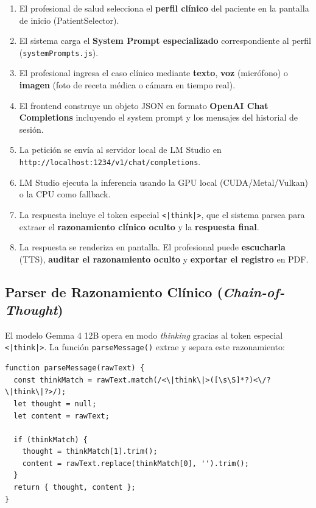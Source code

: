 \documentclass[12pt,a4paper]{article}
\begin{document}
\begin{enumerate}[label=\textbf{Paso \arabic*.}]
  \item El profesional de salud selecciona el \textbf{perfil clínico} del paciente en la pantalla
    de inicio (PatientSelector).
  \item El sistema carga el \textbf{System Prompt especializado} correspondiente al perfil
    (\texttt{systemPrompts.js}).
  \item El profesional ingresa el caso clínico mediante \textbf{texto}, \textbf{voz} (micrófono)
    o \textbf{imagen} (foto de receta médica o cámara en tiempo real).
  \item El frontend construye un objeto JSON en formato \textbf{OpenAI Chat Completions}
    incluyendo el system prompt y los mensajes del historial de sesión.
  \item La petición se envía al servidor local de LM Studio en
    \texttt{http://localhost:1234/v1/chat/completions}.
  \item LM Studio ejecuta la inferencia usando la GPU local (CUDA/Metal/Vulkan) o la CPU como
    fallback.
  \item La respuesta incluye el token especial \texttt{<|think|>}, que el sistema parsea para
    extraer el \textbf{razonamiento clínico oculto} y la \textbf{respuesta final}.
  \item La respuesta se renderiza en pantalla. El profesional puede \textbf{escucharla} (TTS),
    \textbf{auditar el razonamiento oculto} y \textbf{exportar el registro} en PDF.
\end{enumerate}

\subsection{Parser de Razonamiento Clínico (\textit{Chain-of-Thought})}

El modelo Gemma 4 12B opera en modo \textit{thinking} gracias al token especial
\texttt{<|think|>}. La función \texttt{parseMessage()} extrae y separa este razonamiento:

\begin{lstlisting}[style=javascript, caption=Parser de razonamiento clínico (App.jsx)]
function parseMessage(rawText) {
  const thinkMatch = rawText.match(/<\|think\|>([\s\S]*?)<\/?\|think\|?>/);
  let thought = null;
  let content = rawText;

  if (thinkMatch) {
    thought = thinkMatch[1].trim();
    content = rawText.replace(thinkMatch[0], '').trim();
  }
  return { thought, content };
}
\end{lstlisting}
\end{document}
